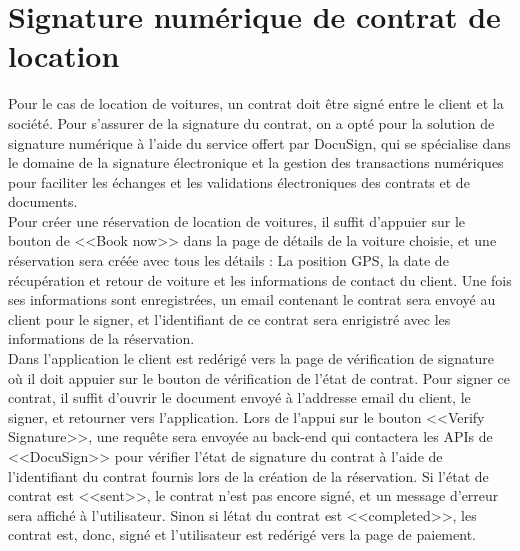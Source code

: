 \section{Signature numérique de contrat de location}
Pour le cas de location de voitures, un contrat doit être signé entre le client et la société. Pour s'assurer de la signature du contrat, on a opté pour la solution de signature numérique à l'aide du service offert par DocuSign, qui se spécialise dans le domaine de la signature électronique et la gestion des transactions numériques pour faciliter les échanges et les validations électroniques des contrats et de documents.\\
\noindent Pour créer une réservation de location de voitures, il suffit d'appuier sur le bouton de <<Book now>> dans la page de détails de la voiture choisie, et une réservation sera créée avec tous les détails : La position GPS, la date de récupération et retour de voiture et les informations de contact du client. Une fois ses informations sont enregistrées, un email contenant le contrat sera envoyé au client pour le signer, et l'identifiant de ce contrat sera enrigistré avec les informations de la réservation.\\
\noindent Dans l'application le client est redérigé vers la page de vérification de signature où il doit appuier sur le bouton de vérification de l'état de contrat. Pour signer ce contrat, il suffit d'ouvrir le document envoyé à l'addresse email du client, le signer, et retourner vers l'application. Lors de l'appui sur le bouton <<Verify Signature>>, une requête sera envoyée au back-end qui contactera les APIs de <<DocuSign>> pour vérifier l'état de signature du contrat à l'aide de l'identifiant du contrat fournis lors de la création de la réservation. Si l'état de contrat est <<sent>>, le contrat n'est pas encore signé, et un message d'erreur sera affiché à l'utilisateur. Sinon si létat du contrat est <<completed>>, les contrat est, donc, signé et l'utilisateur est redérigé vers la page de paiement.
\vspace{1cm}

